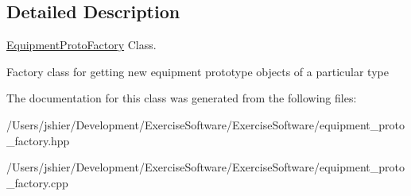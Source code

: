 \subsection{Detailed Description}
\hyperlink{class_equipment_proto_factory}{Equipment\+Proto\+Factory} Class. 

Factory class for getting new equipment prototype objects of a particular type 

The documentation for this class was generated from the following files\+:\begin{DoxyCompactItemize}
\item 
/\+Users/jshier/\+Development/\+Exercise\+Software/\+Exercise\+Software/equipment\+\_\+proto\+\_\+factory.\+hpp\item 
/\+Users/jshier/\+Development/\+Exercise\+Software/\+Exercise\+Software/equipment\+\_\+proto\+\_\+factory.\+cpp\end{DoxyCompactItemize}
